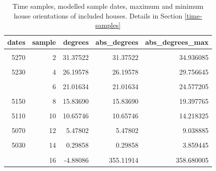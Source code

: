 \documentclass[
  12pt,
  a4paper, twoside]{book}
\begin{document}
\begin{table}

\caption[Vráble time samples, modelled dates and house orientations]{\label{tab:append-time-tab}Time samples, modelled sample dates, maximum and minimum house orientations of included houses. Details in Section \ref{time-samples}}
\centering
\begin{tabular}[t]{rrrrr}
\toprule
dates & sample & degrees & abs\_degrees & abs\_degrees\_max\\
\midrule
\cellcolor{gray!6}{5290} & \cellcolor{gray!6}{1} & \cellcolor{gray!6}{33.96494} & \cellcolor{gray!6}{33.96494} & \cellcolor{gray!6}{37.525805}\\
5270 & 2 & 31.37522 & 31.37522 & 34.936085\\
\cellcolor{gray!6}{5250} & \cellcolor{gray!6}{3} & \cellcolor{gray!6}{28.78550} & \cellcolor{gray!6}{28.78550} & \cellcolor{gray!6}{32.346365}\\
5230 & 4 & 26.19578 & 26.19578 & 29.756645\\
\cellcolor{gray!6}{5210} & \cellcolor{gray!6}{5} & \cellcolor{gray!6}{23.60606} & \cellcolor{gray!6}{23.60606} & \cellcolor{gray!6}{27.166925}\\
\addlinespace
5190 & 6 & 21.01634 & 21.01634 & 24.577205\\
\cellcolor{gray!6}{5170} & \cellcolor{gray!6}{7} & \cellcolor{gray!6}{18.42662} & \cellcolor{gray!6}{18.42662} & \cellcolor{gray!6}{21.987485}\\
5150 & 8 & 15.83690 & 15.83690 & 19.397765\\
\cellcolor{gray!6}{5130} & \cellcolor{gray!6}{9} & \cellcolor{gray!6}{13.24718} & \cellcolor{gray!6}{13.24718} & \cellcolor{gray!6}{16.808045}\\
5110 & 10 & 10.65746 & 10.65746 & 14.218325\\
\addlinespace
\cellcolor{gray!6}{5090} & \cellcolor{gray!6}{11} & \cellcolor{gray!6}{8.06774} & \cellcolor{gray!6}{8.06774} & \cellcolor{gray!6}{11.628605}\\
5070 & 12 & 5.47802 & 5.47802 & 9.038885\\
\cellcolor{gray!6}{5050} & \cellcolor{gray!6}{13} & \cellcolor{gray!6}{2.88830} & \cellcolor{gray!6}{2.88830} & \cellcolor{gray!6}{6.449165}\\
5030 & 14 & 0.29858 & 0.29858 & 3.859445\\
\cellcolor{gray!6}{5010} & \cellcolor{gray!6}{15} & \cellcolor{gray!6}{-2.29114} & \cellcolor{gray!6}{357.70886} & \cellcolor{gray!6}{361.269725}\\
\addlinespace
4990 & 16 & -4.88086 & 355.11914 & 358.680005\\
\bottomrule
\end{tabular}
\end{table}
\end{document}
